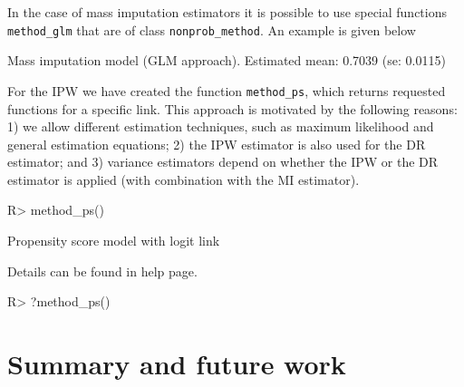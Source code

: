 \documentclass[
]{jss}
\begin{document}
In the case of mass imputation estimators it is possible to use special
functions \texttt{method\_glm} that are of class
\texttt{nonprob\_method}. An example is given below

\begin{CodeChunk}
\begin{CodeOutput}
Mass imputation model (GLM approach). Estimated mean: 0.7039 (se: 0.0115)
\end{CodeOutput}
\end{CodeChunk}

For the IPW we have created the function \texttt{method\_ps}, which
returns requested functions for a specific link. This approach is
motivated by the following reasons: 1) we allow different estimation
techniques, such as maximum likelihood and general estimation equations;
2) the IPW estimator is also used for the DR estimator; and 3) variance
estimators depend on whether the IPW or the DR estimator is applied
(with combination with the MI estimator).

\begin{CodeChunk}
\begin{CodeInput}
R> method_ps()
\end{CodeInput}
\begin{CodeOutput}
Propensity score model with logit link
\end{CodeOutput}
\end{CodeChunk}

Details can be found in help page.

\begin{CodeChunk}
\begin{CodeInput}
R> ?method_ps()
\end{CodeInput}
\end{CodeChunk}

\section{Summary and future work}\label{summary-and-future-work}
\end{document}
